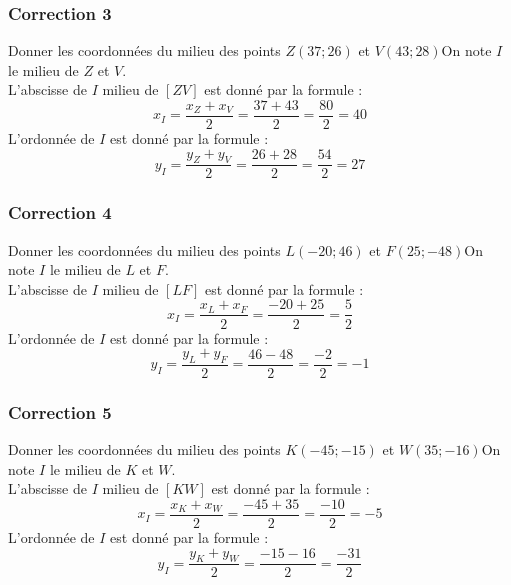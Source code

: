 \documentclass[15pt, mathserif]{beamer}
\begin{document}
\begin{frame}
\vspace{-10mm}
	\frametitle{Correction 3}
Donner les coordonnées du milieu des points $Z(37;26)$ et $V(43;28)$On note $I$ le milieu de $Z$ et $V$. \\ L'abscisse de $I$ milieu de $[ZV]$ est donné par la formule : $$ x_I = \frac{x_Z+x_V}{2} = \frac{37+43}{2}= \dfrac{80}{2}=40$$ L'ordonnée de $I$ est donné par la formule : $$ y_I = \frac{y_Z+y_V}{2} = \frac{26+28}{2}= \dfrac{54}{2}=27$$\end{frame}


\begin{frame}
\vspace{-10mm}
	\frametitle{Correction 4}
Donner les coordonnées du milieu des points $L(-20;46)$ et $F(25;-48)$On note $I$ le milieu de $L$ et $F$. \\ L'abscisse de $I$ milieu de $[LF]$ est donné par la formule : $$ x_I = \frac{x_L+x_F}{2} = \frac{-20+25}{2}= \dfrac{5}{2}$$ L'ordonnée de $I$ est donné par la formule : $$ y_I = \frac{y_L+y_F}{2} = \frac{46-48}{2}= \dfrac{-2}{2}=-1$$\end{frame}


\begin{frame}
\vspace{-10mm}
	\frametitle{Correction 5}
Donner les coordonnées du milieu des points $K(-45;-15)$ et $W(35;-16)$On note $I$ le milieu de $K$ et $W$. \\ L'abscisse de $I$ milieu de $[KW]$ est donné par la formule : $$ x_I = \frac{x_K+x_W}{2} = \frac{-45+35}{2}= \dfrac{-10}{2}=-5$$ L'ordonnée de $I$ est donné par la formule : $$ y_I = \frac{y_K+y_W}{2} = \frac{-15-16}{2}= \dfrac{-31}{2}$$\end{frame}
\end{document}
